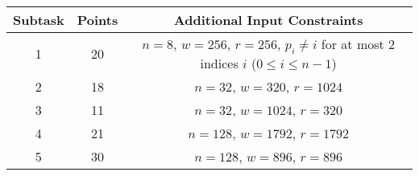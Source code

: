 \begin{center}
\renewcommand{\arraystretch}{1.5}
\begin{tabular}{|c|c|c|}
\hline
Subtask & Points & Additional Input Constraints\\
\hline
1 & 20 & $n = 8$, $w = 256$, $r = 256$, $p_i \neq i$ for at most 2 indices $i$ ($0 \le i \leq n - 1$) \\
\hline
2 & 18 & $n = 32$, $w = 320$, $r = 1024$ \\
\hline
3 & 11 & $n = 32$, $w = 1024$, $r = 320$ \\
\hline
4 & 21 & $n = 128$, $w = 1792$, $r = 1792$ \\
\hline
5 & 30 & $n = 128$, $w = 896$, $r = 896$ \\
\hline
\end{tabular}
\end{center}